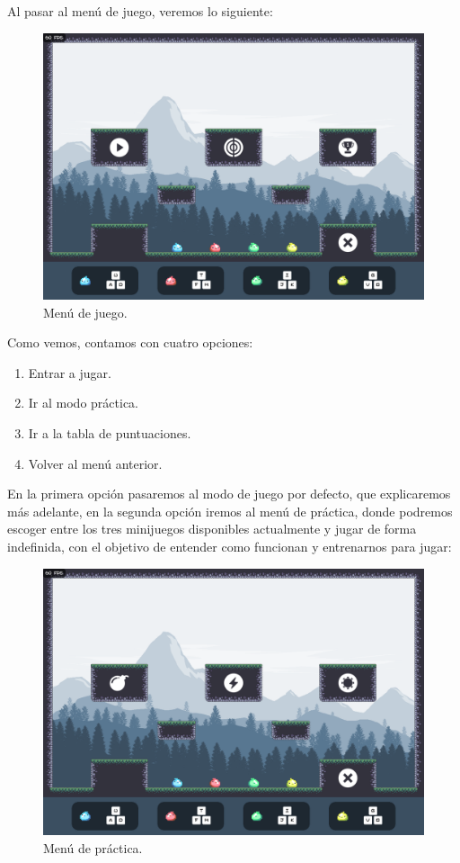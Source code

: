 \documentclass[12pt, spanish]{article}
\begin{document}
Al pasar al menú de juego, veremos lo siguiente:

\begin{figure}[H]
	\centering
	\includegraphics[width=\textwidth]{"modos/menu_juego.png"}
	\caption{Menú de juego.}\label{figure:menu_juego}
\end{figure}

Como vemos, contamos con cuatro opciones:

\begin{enumerate}
	\item Entrar a jugar.
	\item Ir al modo práctica.
	\item Ir a la tabla de puntuaciones.
	\item Volver al menú anterior.
\end{enumerate}


En la primera opción pasaremos al modo de juego por defecto, que explicaremos más adelante, en la segunda opción iremos al menú de práctica, donde podremos escoger entre los tres minijuegos disponibles actualmente y jugar de forma indefinida, con el objetivo de entender como funcionan y entrenarnos para jugar:

\begin{figure}[H]
	\centering
	\includegraphics[width=\textwidth]{"modos/menu_practica.png"}
	\caption{Menú de práctica.}\label{figure:menu_practica}
\end{figure}
\end{document}
